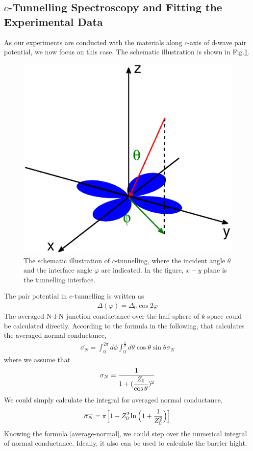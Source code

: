 \subsection{$c$-Tunnelling Spectroscopy and Fitting the Experimental Data}
As our experiments are conducted with the materials along $c$-axis of d-wave pair potential, we now focus on this case. The schematic illustration is shown in Fig.\ref{fig:c-tunnelling schematic}.
\begin{figure}[htbp]
\small
\centering
\includegraphics[width=12cm]{./Figures/c-tunnelling.eps}
\caption{The schematic illustration of $c$-tunnelling, where the incident angle $\theta$ and the interface angle $\varphi$ are indicated. In the figure, $x-y$ plane is the tunnelling interface.}
\label{fig:c-tunnelling schematic}
\end{figure}
The pair potential in $c$-tunnelling is written as
\begin{eqnarray}
\Delta(\varphi)=\Delta_0\cos2\varphi
\end{eqnarray}
The averaged N-I-N junction conductance over the half-sphere of $k$ space could be calculated directly.
According to the formula in the following, that calculates the averaged normal conductance,
\begin{eqnarray}
\overline{\sigma_N}=\int_0^{2\pi}d\phi \int_{0}^{\frac{\pi}{2}} d\theta \cos\theta\sin\theta \sigma_N
\end{eqnarray}
where we assume that 
\begin{eqnarray}
\sigma_N={\displaystyle\frac{1}{1+({\displaystyle\frac{Z_0}{\cos\theta}})^2}}
\end{eqnarray}
We could simply calculate the integral for averaged normal conductance,
\begin{eqnarray}\label{average-normal}
\overline{\sigma_N}=\pi \Big[1-Z_0^2\ln\Big(1+\DF{1}{Z_0^2}\Big)\Big]
\end{eqnarray}
Knowing the formula \eqref{average-normal}, we could step over the numerical integral of normal conductance. Ideally, it also can be used to calculate the barrier hight.
 
